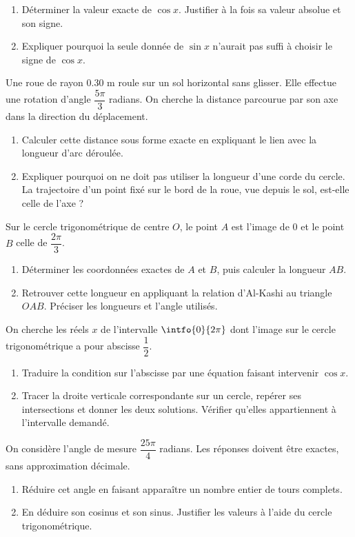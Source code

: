 \begin{enumerate}[label=\arabic*.]
\item Déterminer la valeur exacte de $\cos x$. Justifier à la fois sa valeur absolue et son signe.
\item Expliquer pourquoi la seule donnée de $\sin x$ n’aurait pas suffi à choisir le signe de $\cos x$.
\end{enumerate}
Une roue de rayon $\num{0,30}$ m roule sur un sol horizontal sans glisser. Elle effectue une rotation d’angle $\dfrac{5\pi}{3}$ radians. On cherche la distance parcourue par son axe dans la direction du déplacement.
\begin{enumerate}[label=\arabic*.]
\item Calculer cette distance sous forme exacte en expliquant le lien avec la longueur d’arc déroulée.
\item Expliquer pourquoi on ne doit pas utiliser la longueur d’une corde du cercle. La trajectoire d’un point fixé sur le bord de la roue, vue depuis le sol, est-elle celle de l’axe ?
\end{enumerate}
Sur le cercle trigonométrique de centre $O$, le point $A$ est l’image de 0 et le point $B$ celle de $\dfrac{2\pi}{3}$.
\begin{enumerate}[label=\arabic*.]
\item Déterminer les coordonnées exactes de $A$ et $B$, puis calculer la longueur $AB$.
\item Retrouver cette longueur en appliquant la relation d’Al-Kashi au triangle $OAB$. Préciser les longueurs et l’angle utilisés.
\end{enumerate}
On cherche les réels $x$ de l’intervalle $\intfo{0}{2\pi}$ dont l’image sur le cercle trigonométrique a pour abscisse $\dfrac12$.
\begin{enumerate}[label=\arabic*.]
\item Traduire la condition sur l’abscisse par une équation faisant intervenir $\cos x$.
\item Tracer la droite verticale correspondante sur un cercle, repérer ses intersections et donner les deux solutions. Vérifier qu’elles appartiennent à l’intervalle demandé.
\end{enumerate}
On considère l’angle de mesure $\dfrac{25\pi}{4}$ radians. Les réponses doivent être exactes, sans approximation décimale.
\begin{enumerate}[label=\arabic*.]
\item Réduire cet angle en faisant apparaître un nombre entier de tours complets.
\item En déduire son cosinus et son sinus. Justifier les valeurs à l’aide du cercle trigonométrique.
\end{enumerate}
